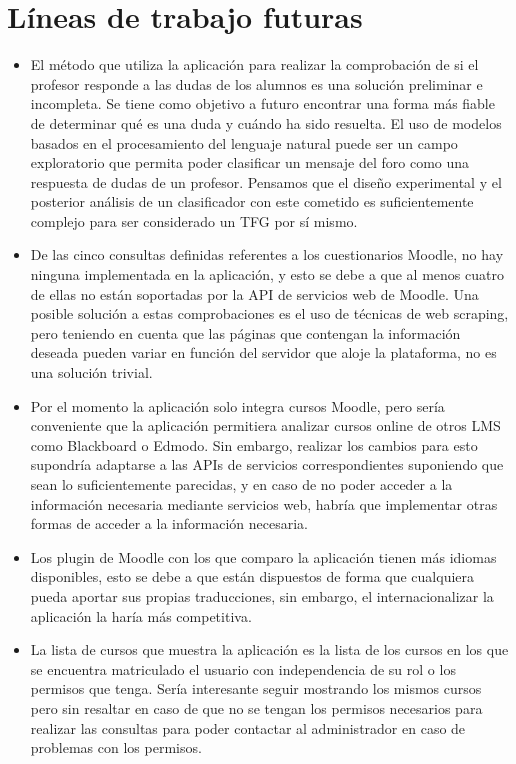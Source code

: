 
\section{Líneas de trabajo futuras}
\begin{itemize}
	\item
	El método que utiliza la aplicación para realizar la comprobación de si el profesor responde a las dudas de los alumnos es una solución preliminar e incompleta. Se tiene como objetivo a futuro encontrar una forma más fiable de determinar qué es una duda y cuándo ha sido resuelta.
	El uso de modelos basados en el procesamiento del lenguaje natural puede ser un campo exploratorio que permita poder clasificar un mensaje del foro como una respuesta de dudas de un profesor. Pensamos que el diseño experimental y el posterior análisis de un clasificador con este cometido es suficientemente complejo para ser considerado un TFG por sí mismo.
	\item
	De las cinco consultas definidas referentes a los cuestionarios Moodle, no hay ninguna implementada en la aplicación, y esto se debe a que al menos cuatro de ellas no están soportadas por la API de servicios web de Moodle.
	Una posible solución a estas comprobaciones es el uso de técnicas de web scraping, pero teniendo en cuenta que las páginas que contengan la información deseada pueden variar en función del servidor que aloje la plataforma, no es una solución trivial.
	\item
	Por el momento la aplicación solo integra cursos Moodle, pero sería conveniente que la aplicación permitiera analizar cursos online de otros LMS como Blackboard o Edmodo. Sin embargo, realizar los cambios para esto supondría adaptarse a las APIs de servicios correspondientes suponiendo que sean lo suficientemente parecidas, y en caso de no poder acceder a la información necesaria mediante servicios web, habría que implementar otras formas de acceder a la información necesaria.
	\item
	Los plugin de Moodle con los que comparo la aplicación tienen más idiomas disponibles, esto se debe a que están dispuestos de forma que cualquiera pueda aportar sus propias traducciones, sin embargo, el internacionalizar la aplicación la haría más competitiva.
	\item
	La lista de cursos que muestra la aplicación es la lista de los cursos en los que se encuentra matriculado el usuario con independencia de su rol o los permisos que tenga. Sería interesante seguir mostrando los mismos cursos pero sin resaltar en caso de que no se tengan los permisos necesarios para realizar las consultas para poder contactar al administrador en caso de problemas con los permisos.
\end{itemize}